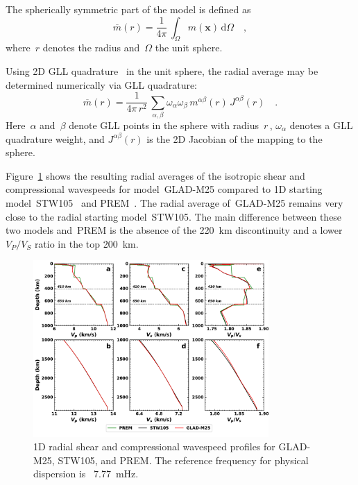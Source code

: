 \documentclass[extra,mreferee]{gji}
\begin{document}
The spherically symmetric part of the model is defined as
\begin{equation}
    \overline{m}(r)=\frac{1}{4\pi}\,\int_\Omega m(\mathbf{x})\,\mathrm{d} \Omega
    \quad,
\end{equation}
where~$r$ denotes the radius and~$\Omega$ the unit sphere.

Using 2D GLL quadrature~\citep{KoTr99} in the unit sphere,
the radial average may be determined numerically via GLL quadrature:
\begin{equation}
    \overline{m}(r)=\frac{1}{4\pi\,r^2}\,\sum_{\alpha,\beta}\omega_\alpha\omega_\beta\,m^{\alpha\beta}(r)\,J^{\alpha\beta}(r)
    \quad.
    \label{eq:radial_average}
\end{equation}
Here~$\alpha$ and~$\beta$ denote GLL points in the sphere with radius~$r$\,,
$\omega_\alpha$ denotes a GLL quadrature weight, and $J^{\alpha\beta}(r)$ is the 2D Jacobian of the mapping to the sphere.

Figure~\ref{fig:global-average} shows the resulting radial averages of the isotropic shear and compressional wavespeeds for model~GLAD-M25
compared to 1D starting model~STW105~\citep{kustowski2008anisotropic} and PREM~\citep{PREM}.
The radial average of~GLAD-M25 remains very close to the radial starting model~STW105.
The main difference between these two models and~PREM
is the absence of the 220~km discontinuity and a lower~$V_P/V_S$ ratio in the top 200~km.

\begin{figure}
  \centering
  \includegraphics[width=0.8\textwidth]{figures/1d_profile.pdf}
  \caption{\small{1D radial shear and compressional wavespeed profiles for GLAD-M25, STW105, and PREM.
  The reference frequency for physical dispersion is ~7.77~mHz.}}
  \label{fig:global-average}
\end{figure}
\end{document}

